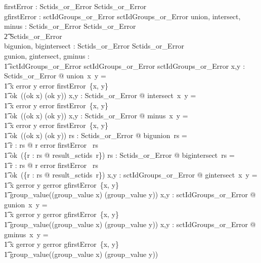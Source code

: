 \documentclass{article}
\begin{document}
\begin{axdef}
   firstError : \power Sctids\_or\_Error \fun Sctids\_or\_Error \\
   gfirstError : \power sctIdGroups\_or\_Error \fun sctIdGroups\_or\_Error
\also
   union, intersect, minus : Sctids\_or\_Error \fun Sctids\_or\_Error \fun \\
\t2 Sctids\_or\_Error \\
   bigunion, bigintersect : \power Sctids\_or\_Error \fun Sctids\_or\_Error \\
\also
   gunion, gintersect, gminus : \\
   \t1 sctIdGroups\_or\_Error \fun sctIdGroups\_or\_Error \fun sctIdGroups\_or\_Error
\where
   \forall x,y : Sctids\_or\_Error @ union~x~y = \\
\t1 \IF x \in \ran error \lor  y \in \ran error \THEN firstError~\{x, y\} \\
\t1 \ELSE ok~((ok \inv x) \cup (ok \inv y))
\also
   \forall x,y : Sctids\_or\_Error @ intersect~x~y = \\
\t1 \IF x \in \ran error \lor y \in \ran error \THEN firstError~\{x, y\} \\
\t1 \ELSE ok~((ok \inv x) \cap (ok \inv y))
\also
   \forall x,y : Sctids\_or\_Error @ minus~x~y = \\
\t1 \IF x \in \ran error \lor y \in \ran error \THEN firstError~\{x, y\} \\
\t1 \ELSE ok~((ok \inv x) \setminus (ok \inv y))
\also
  \forall rs : \power Sctids\_or\_Error @ bigunion~rs = \\
\t1 \IF \exists r : rs @ r \in \ran error \THEN firstError~ rs \\
\t1 \ELSE ok~(\bigcup \{r : rs @ result\_sctids~r\})
\also
  \forall rs : \power Sctids\_or\_Error @ bigintersect~rs = \\
\t1 \IF \exists r : rs @ r \in \ran error \THEN firstError~ rs \\
\t1 \ELSE ok~(\bigcap \{r : rs @ result\_sctids~r\})
\also
   \forall x,y : sctIdGroups\_or\_Error @ gintersect~x~y = \\
\t1 \IF x \in \ran gerror \lor y \in \ran gerror \THEN gfirstError~\{x, y\} \\
\t1 \ELSE group\_value((group\_value \inv x) \cap (group\_value \inv y))
\also
\forall x,y : sctIdGroups\_or\_Error @ gunion~x~y = \\
\t1 \IF x \in \ran gerror \lor y \in \ran gerror \THEN gfirstError~\{x, y\} \\
\t1 \ELSE group\_value((group\_value \inv x) \cup (group\_value \inv y))
\also
\forall x,y : sctIdGroups\_or\_Error @ gminus~x~y = \\
\t1 \IF x \in \ran gerror \lor y \in \ran gerror \THEN gfirstError~\{x, y\} \\
\t1 \ELSE group\_value((group\_value \inv x) \setminus (group\_value \inv y))
\end{axdef}
\pagebreak
\appendix
   
\end{document}
